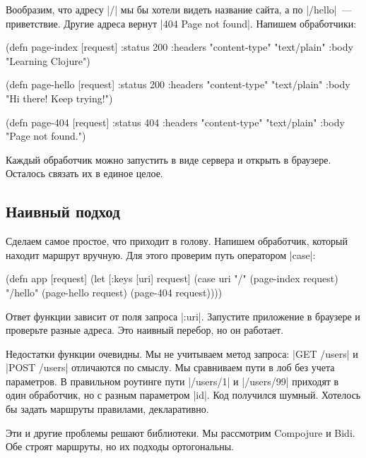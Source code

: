 Вообразим, что адресу \spverb|/| мы бы хотели видеть название сайта, а по
\spverb|/hello|~--- приветствие. Другие адреса вернут \spverb|404 Page not found|.
Напишем обработчики:

\begin{english}
  \begin{clojure}
(defn page-index [request]
  {:status 200
   :headers {"content-type" "text/plain"}
   :body "Learning Clojure"})

(defn page-hello [request]
  {:status 200
   :headers {"content-type" "text/plain"}
   :body "Hi there! Keep trying!"})

(defn page-404 [request]
  {:status 404
   :headers {"content-type" "text/plain"}
   :body "Page not found."})
  \end{clojure}
\end{english}

Каждый обработчик можно запустить в виде сервера и открыть в браузере. Осталось
связать их в единое целое.

\subsection{Наивный подход}

Сделаем самое простое, что приходит в голову. Напишем обработчик, который
находит маршрут вручную. Для этого проверим путь оператором \spverb|case|:

\begin{english}
  \begin{clojure}
(defn app [request]
  (let [{:keys [uri]} request]
    (case uri
      "/"      (page-index request)
      "/hello" (page-hello request)
      (page-404 request))))
  \end{clojure}
\end{english}

Ответ функции зависит от поля запроса \spverb|:uri|. Запустите приложение в
браузере и проверьте разные адреса. Это наивный перебор, но он работает.

Недостатки функции очевидны. Мы не учитываем метод запроса: \spverb|GET /users|
и \spverb|POST /users| отличаются по смыслу. Мы сравниваем пути в лоб без учета
параметров. В правильном роутинге пути \spverb|/users/1| и \spverb|/users/99|
приходят в один обработчик, но с разным параметром \spverb|id|. Код получился
шумный. Хотелось бы задать маршруты правилами, декларативно.

Эти и другие проблемы решают библиотеки. Мы рассмотрим Compojure и Bidi. Обе
строят маршруты, но их подходы ортогональны.

